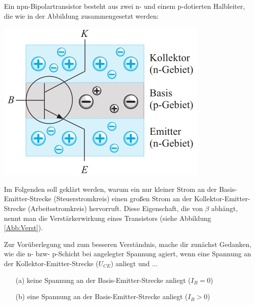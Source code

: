 \begin{ZW}
Ein npn-Bipolartransistor besteht aus zwei n- und einem p-dotierten Halbleiter, die wie in der Abbildung zusammengesetzt werden:

\begin{center}
\includegraphics[scale=.8]{pics/AufbauTrans}
\end{center}

Im Folgenden soll geklärt werden, warum ein nur kleiner Strom an der Basis-Emitter-Strecke (Steuerstromkreis) einen großen Strom an der Kollektor-Emitter-Strecke (Arbeitsstromkreis) hervorruft.
Diese Eigenschaft, die von $\beta$ abhängt, nennt man die Verstärkerwirkung eines Transistors (siehe Abbildung \ref{Abb:Verst}).




\begin{Aufgabe} \label{Aufg:npn}
Zur Vorüberlegung und zum besseren Verständnis, mache dir zunächst Gedanken, wie die n- bzw- p-Schicht bei angelegter Spannung agiert, wenn eine Spannung an der Kollektor-Emitter-Strecke ($U_{CE}$) anliegt und ...

\begin{itemize}
\item[(a)] keine Spannung an der Basis-Emitter-Strecke anliegt ($I_B=0$)
\item[(b)] eine Spannung an der Basis-Emitter-Strecke anliegt ($I_B>0$)
\end{itemize}
\end{Aufgabe}


\begin{Loesung}


\end{Loesung}
\end{ZW}
